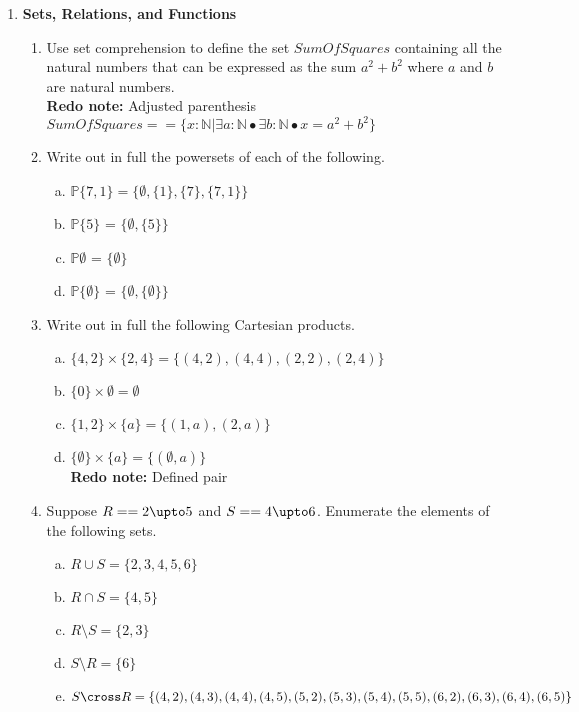\documentclass{article}
\newcommand{\define}{==}
\begin{document}

\begin{enumerate}[\bf I.]
\item \textbf{Sets, Relations, and Functions}
\begin{enumerate}[1.]
\item Use set comprehension to define the set $\mathit{SumOfSquares}$
containing all the natural numbers that can be expressed as the sum
$a^2 + b^2$ where $a$ and $b$ are natural numbers. \\
\textbf{Redo note:} Adjusted parenthesis \\
$SumOfSquares == \{x: \mathbb{N} | \exists a : \mathbb{N} \bullet \exists b : \mathbb{N} \bullet  x = a^2 + b^2 \}$ \\

\item Write out in full the powersets of each of the following.
\begin{enumerate}[a.]
\item $\mathbb{P}\{7,1\} = \{\emptyset, \{1\}, \{7\}, \{7,1\}\}$
\item $\mathbb{P}\{5\}$ = $\{\emptyset, \{5\}\}$
\item $\mathbb{P} \emptyset$ = $\{\emptyset\}$
\item $\mathbb{P}\{\emptyset\}$ = $\{\emptyset, \{\emptyset\}\}$
\end{enumerate}
\item Write out in full the following Cartesian products.
\begin{enumerate}[a.]
\item $\{4,2\}\times\{2,4\} = \{(4,2), (4,4), (2,2), (2,4)\}$
\item $\{0\}\times\emptyset = \emptyset$
\item $\{1,2\}\times\{a\} = \{(1,a), (2,a) \}$
\item $\{\emptyset\}\times\{a\} = \{(\emptyset, a)\}$ \\
\textbf{Redo note:} Defined pair \\  
\end{enumerate}

\item Suppose $R \define 2 \upto 5$ and $S == 4 \upto 6$. Enumerate the elements of the following sets.

\begin{enumerate}[a.]
\item $R \cup S = \{2,3,4,5,6\}$
\item $R \cap S = \{4, 5\}$
\item $R \setminus S = \{2,3\}$
\item $S \setminus R = \{6\}$
\item $S \cross R = \{(4,2), (4,3), (4,4), (4,5), (5,2), (5,3), (5,4), (5,5), (6,2), (6,3), (6,4), (6,5)\}$
\end{enumerate}


\end{enumerate}
\end{enumerate}
\end{document}
